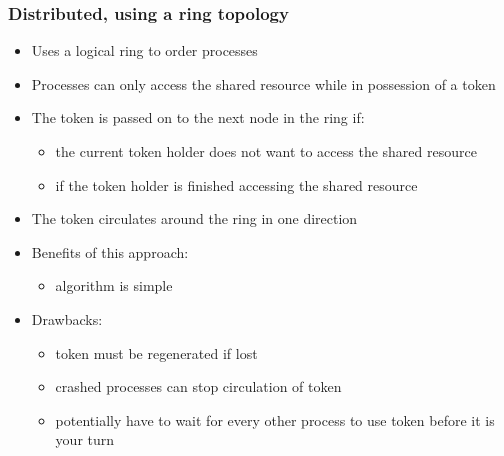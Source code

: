\subsubsection{Distributed, using a ring topology}
\begin{itemize}
	\item Uses a logical ring to order processes
	\item Processes can only access the shared resource while in possession of a token
	\item The token is passed on to the next node in the ring if:
	\begin{itemize}
		\item the current token holder does not want to access the shared resource
		\item if the token holder is finished accessing the shared resource
	\end{itemize}
	\item The token circulates around the ring in one direction
	\item Benefits of this approach:
	\begin{itemize}
		\item algorithm is simple
	\end{itemize}
	\item Drawbacks:
	\begin{itemize}
		\item token must be regenerated if lost
		\item crashed processes can stop circulation of token
		\item potentially have to wait for every other process to use token before it is your turn
	\end{itemize}	
\end{itemize}

